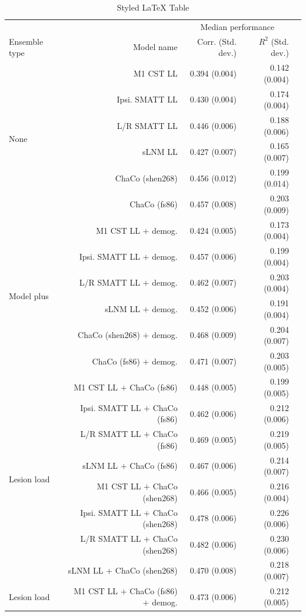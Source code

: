 \documentclass[10pt]{article}
\def\Plus{\texttt{+}}
\begin{document}
\begin{table}[h]
\centering
\caption{Styled LaTeX Table}
\label{table:5}
\begin{tabular}{lrrrr}
\toprule
 &  & \multicolumn{2}{c}{Median performance} \\
Ensemble type & Model name & Corr. (Std. dev.) & $R^2$ (Std. dev.) \\
\midrule
\multirow[t]{6}{*}{None} & M1 CST LL & 0.394 (0.004) & 0.142 (0.004) \\
 & Ipsi. SMATT LL & 0.430 (0.004) & 0.174 (0.004) \\
 & L/R SMATT LL & 0.446 (0.006) & 0.188 (0.006) \\
 & sLNM LL & 0.427 (0.007) & 0.165 (0.007) \\
 & ChaCo (shen268) & 0.456 (0.012) & 0.199 (0.014) \\
 & ChaCo (fs86) & 0.457 (0.008) & 0.203 (0.009) \\
\multirow[t]{6}{*}{Model plus } & M1 CST LL $\Plus$ demog. & 0.424 (0.005) & 0.173 (0.004) \\
plus demographics & Ipsi. SMATT LL $\Plus$ demog. & 0.457 (0.006) & 0.199 (0.004) \\
 & L/R SMATT LL $\Plus$ demog. & 0.462 (0.007) & 0.203 (0.004) \\
 & sLNM LL $\Plus$ demog. & 0.452 (0.006) & 0.191 (0.004) \\
 & ChaCo (shen268) $\Plus$ demog. & 0.468 (0.009) & 0.204 (0.007) \\
 & ChaCo (fs86) $\Plus$ demog. & 0.471 (0.007) & 0.203 (0.005) \\
\multirow[t]{8}{*}{Lesion load } & M1 CST LL $\Plus$ ChaCo (fs86) & 0.448 (0.005) & 0.199 (0.005) \\
 plus ChaCo & Ipsi. SMATT LL $\Plus$ ChaCo (fs86) & 0.462 (0.006) & 0.212 (0.006) \\
 & L/R SMATT LL $\Plus$ ChaCo (fs86) & 0.469 (0.005) & 0.219 (0.005) \\
 & sLNM LL $\Plus$ ChaCo (fs86) & 0.467 (0.006) & 0.214 (0.007) \\
 & M1 CST LL $\Plus$ ChaCo (shen268) & 0.466 (0.005) & 0.216 (0.004) \\
 & Ipsi. SMATT LL $\Plus$ ChaCo (shen268) & 0.478 (0.006) & 0.226 (0.006) \\
 & L/R SMATT LL $\Plus$ ChaCo (shen268) & 0.482 (0.006) & 0.230 (0.006) \\
 & sLNM LL $\Plus$ ChaCo (shen268) & 0.470 (0.008) & 0.218 (0.007) \\
\multirow[t]{8}{*}{Lesion load} & M1 CST LL $\Plus$ ChaCo  (fs86) $\Plus$ demog. & 0.473 (0.006) & 0.212 (0.005) \\

\end{tabular}
\end{table}
\end{document}
